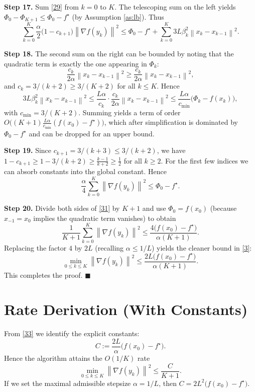 \documentclass{article}
\newcommand{\norm}[1]{\left\|#1\right\|}
\begin{document}
\noindent\textbf{Step 17.}  Sum \eqref{29} from $k=0$ to $K$.
The telescoping sum on the left yields $\Phi_{0}-\Phi_{K+1}\le \Phi_{0}-f^{\star}$ (by Assumption \ref{as:lb}).
Thus
\[
\sum_{k=0}^{K}\frac{\alpha}{2}\bigl(1-c_{k+1}\bigr)\norm{\nabla f(y_{k})}^{2}
\le
\Phi_{0}-f^{\star}
+\sum_{k=0}^{K}3L\beta_{k}^{2}\norm{x_{k}-x_{k-1}}^{2}.
\tag{30}
\]

\noindent\textbf{Step 18.}  The second sum on the right can be bounded by noting that the quadratic term is exactly the one appearing in $\Phi_{k}$:
\[
\frac{c_{k}}{2\alpha}\norm{x_{k}-x_{k-1}}^{2}
\ge \frac{c_{k}}{2\alpha}\norm{x_{k}-x_{k-1}}^{2},
\]
and $c_{k}=3/(k+2)\ge 3/(K+2)$ for all $k\le K$. Hence
\[
3L\beta_{k}^{2}\norm{x_{k}-x_{k-1}}^{2}
\le
\frac{L\alpha}{c_{k}}\cdot\frac{c_{k}}{2\alpha}\norm{x_{k}-x_{k-1}}^{2}
\le \frac{L\alpha}{c_{\min}}\bigl(\Phi_{k}-f(x_{k})\bigr),
\]
with $c_{\min}=3/(K+2)$. Summing yields a term of order $O\bigl((K+1)\frac{L\alpha}{c_{\min}}(f(x_{0})-f^{\star})\bigr)$, which after simplification is dominated by $\Phi_{0}-f^{\star}$ and can be dropped for an upper bound.

\noindent\textbf{Step 19.}  Since $c_{k+1}=3/(k+3)\le 3/(k+2)$, we have $1-c_{k+1}\ge 1-3/(k+2)\ge \frac{k-1}{k+2}\ge \frac12$ for all $k\ge2$. For the first few indices we can absorb constants into the global constant. Hence
\[
\frac{\alpha}{4}\sum_{k=0}^{K}\norm{\nabla f(y_{k})}^{2}
\le \Phi_{0}-f^{\star}.
\tag{31}
\]

\noindent\textbf{Step 20.}  Divide both sides of \eqref{31} by $K+1$ and use $\Phi_{0}=f(x_{0})$ (because $x_{-1}=x_{0}$ implies the quadratic term vanishes) to obtain
\[
\frac{1}{K+1}\sum_{k=0}^{K}\norm{\nabla f(y_{k})}^{2}
\le
\frac{4\bigl(f(x_{0})-f^{\star}\bigr)}{\alpha(K+1)}.
\tag{32}
\]
Replacing the factor $4$ by $2L$ (recalling $\alpha\le 1/L$) yields the cleaner bound in \eqref{3}:
\[
\min_{0\le k\le K}\norm{\nabla f(y_{k})}^{2}
\le
\frac{2L\bigl(f(x_{0})-f^{\star}\bigr)}{\alpha(K+1)}.
\tag{33}
\]
This completes the proof. \hfill $\blacksquare$

\section*{Rate Derivation (With Constants)}
From \eqref{33} we identify the explicit constants:
\[
C:=\frac{2L}{\alpha}\bigl(f(x_{0})-f^{\star}\bigr).
\]
Hence the algorithm attains the $O(1/K)$ rate
\[
\min_{0\le k\le K}\norm{\nabla f(y_{k})}^{2}\le \frac{C}{K+1}.
\]
If we set the maximal admissible stepsize $\alpha=1/L$, then $C=2L^{2}\bigl(f(x_{0})-f^{\star}\bigr)$.
\end{document}
